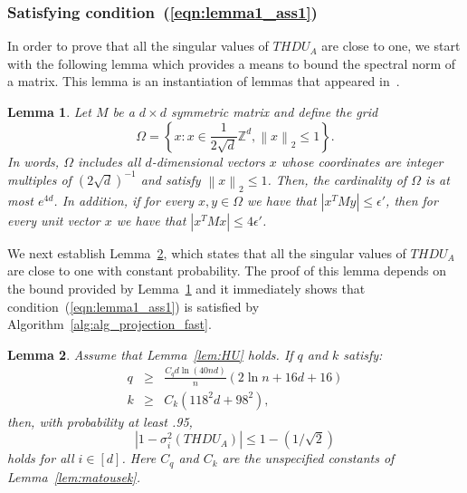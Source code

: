 \documentclass[11pt]{article}
\newcommand{\VTTNorm }[1]{\mbox{}\left\|#1\right\|_2  }
\newcommand{\abs }[1]{\left|#1\right|}
\newtheorem{lemma}{Lemma}
\begin{document}
\subsubsection{Satisfying condition~(\ref{eqn:lemma1_ass1})}
In order to prove that all the singular values of $THDU_A$ are close to one, we start with the following lemma which provides a means to bound the spectral norm of a matrix. This lemma is an instantiation of lemmas that appeared in~\cite{AHK06,FO05}.
\begin{lemma}\label{lem:AroraHazenKale}
Let $M$ be a $d \times d$ symmetric matrix and define the grid
\begin{equation} \label{eqn:grid}
\Omega=\left\{x: x\in\frac{1}{2\sqrt{d}}\mathbb{Z}^{d},\VTTNorm{x}\le1\right\}  .
\end{equation}
In words, $\Omega$ includes all $d$-dimensional vectors $x$ whose coordinates are integer multiples of $\left(2\sqrt{d}\right)^{-1}$ and satisfy $\VTTNorm{x}\leq 1$. Then, the cardinality of $\Omega$ is at most $e^{4d}$. In addition, if for every $x,y\in\Omega$ we have that $\abs{x^TMy}\le \epsilon'$, then for every unit vector $x$ we have that $\abs{x^TMx}\le 4\epsilon'$.
\end{lemma}
We next establish Lemma~\ref{lem:project_lem20pf}, which states that all the singular values of $THDU_A$ are close to one with constant probability. The proof of this lemma depends on the bound provided by Lemma~\ref{lem:AroraHazenKale} and it immediately shows that condition~(\ref{eqn:lemma1_ass1}) is satisfied by Algorithm~\ref{alg:alg_projection_fast}.
\begin{lemma}\label{lem:project_lem20pf}
Assume that Lemma~\ref{lem:HU} holds. If $q$ and $k$ satisfy:
\begin{eqnarray}
\label{eqn:chooseq} q &\geq& \frac{C_q d \ln(40nd)}{n}\left(2\ln n + 16d + 16\right)\\
\label{eqn:choosek} k &\geq& C_k \left(118^2 d + 98^2\right),
\end{eqnarray}
then, with probability at least .95,
$$\abs{1 - \sigma_i^2\left(THDU_A\right)} \leq 1-(1/\sqrt{2})$$
holds for all $i \in [d]$. Here $C_q$ and $C_k$ are the unspecified constants of Lemma~\ref{lem:matousek}.
\end{lemma}
\end{document}
